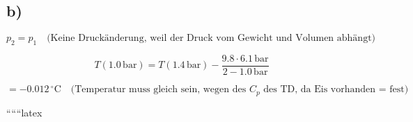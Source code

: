 

\subsection*{b)}

\begin{equation*}
p_2 = p_1 \quad \text{(Keine Druckänderung, weil der Druck vom Gewicht und Volumen abhängt)}
\end{equation*}


\begin{equation*}
T(1.0 \, \text{bar}) = T(1.4 \, \text{bar}) - \frac{9.8 \cdot 6.1 \, \text{bar}}{2 - 1.0 \, \text{bar}}
\end{equation*}

\begin{equation*}
= -0.012 \, ^\circ \text{C} \quad \text{(Temperatur muss gleich sein, wegen des } C_p \text{ des TD, da Eis vorhanden = fest)}
\end{equation*}

``````latex